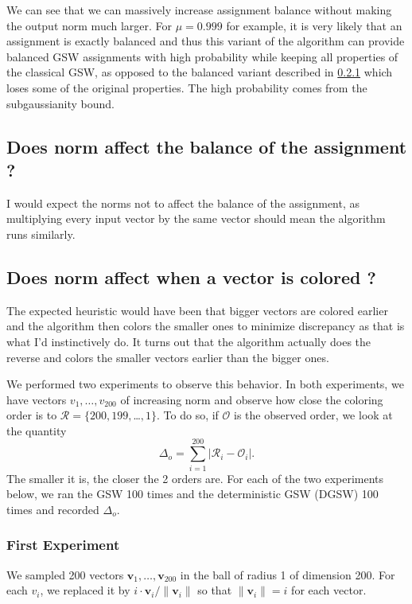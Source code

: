 \documentclass[12pt]{article}
\begin{document}
We can see that we can massively increase assignment balance without making the output norm much larger. For $\mu=0.999$ for example, it is very likely that an assignment is exactly balanced and thus this variant of the algorithm can provide balanced GSW assignments with high probability while keeping all properties of the classical GSW, as opposed to the balanced variant described in \ref{} which loses some of the original properties. The high probability comes from the subgaussianity bound.

\subsection{Does norm affect the balance of the assignment ?}
I would expect the norms not to affect the balance of the assignment, as multiplying every input vector by the same vector should mean the algorithm runs similarly.

\subsection{Does norm affect when a vector is colored ?}
The expected heuristic would have been that bigger vectors are colored earlier and the algorithm then colors the smaller ones to minimize discrepancy as that is what I'd instinctively do. It turns out that the algorithm actually does the reverse and colors the smaller vectors earlier than the bigger ones.

We performed two experiments to observe this behavior. In both experiments, we have vectors $v_1,\dots,v_200$ of increasing norm and observe how close the coloring order is to $\mathcal{R}=\{200,199,$\dots$,1\}$. To do so, if $\mathcal{O}$ is the observed order, we look at the quantity 
\begin{equation}
\Delta_{o}=\sum_{i=1}^{200}|\mathcal{R}_i-\mathcal{O}_i|.
\label{orderdistance}
\end{equation}
The smaller it is, the closer the 2 orders are. For each of the two experiments below, we ran the GSW 100 times and the deterministic GSW (DGSW) 100 times and recorded $\Delta_o$.

\subsubsection{First Experiment}
We sampled 200 vectors $\textbf{v}_1,\dots,\textbf{v}_{200}$ in the ball of radius 1 of dimension 200. For each $v_i$, we replaced it by $i\cdot \textbf{v}_i/\|\textbf{v}_i\|$ so that $\|\textbf{v}_i\|=i$ for each vector. 
\end{document}
